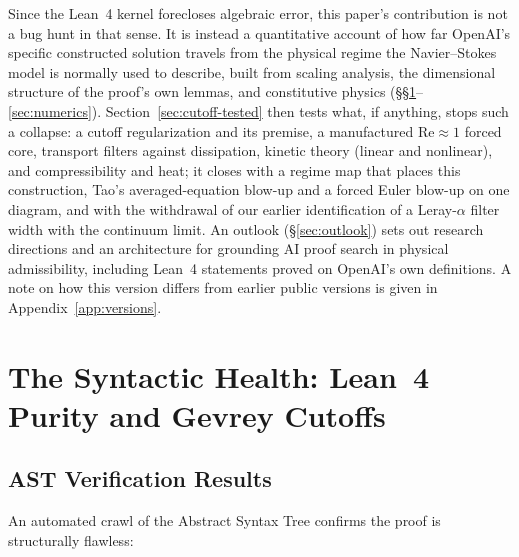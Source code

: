 \documentclass[11pt,a4paper]{article}
\begin{document}
Since the Lean~4 kernel forecloses algebraic error, this paper's contribution is not a bug hunt in
that sense. It is instead a quantitative account of how far OpenAI's specific constructed solution
travels from the physical regime the Navier--Stokes model is normally used to describe, built from
scaling analysis, the dimensional structure of the proof's own lemmas, and constitutive physics
(\S\S\ref{sec:syntax}--\ref{sec:numerics}). Section~\ref{sec:cutoff-tested} then tests what, if
anything, stops such a collapse: a cutoff regularization and its premise, a manufactured
$\mathrm{Re}\approx1$ forced core, transport filters against dissipation, kinetic theory (linear and
nonlinear), and compressibility and heat; it closes with a regime map that places this construction,
Tao's averaged-equation blow-up and a forced Euler blow-up on one diagram, and with the withdrawal of
our earlier identification of a Leray-$\alpha$ filter width with the continuum limit. An outlook
(\S\ref{sec:outlook}) sets out research directions and an architecture for grounding AI proof search
in physical admissibility, including Lean~4 statements proved on OpenAI's own definitions. A note on
how this version differs from earlier public versions is given in Appendix~\ref{app:versions}.

\section{The Syntactic Health: Lean~4 Purity and Gevrey Cutoffs}
\label{sec:syntax}

\subsection{AST Verification Results}

An automated crawl of the Abstract Syntax Tree confirms the proof is structurally flawless:
\end{document}
